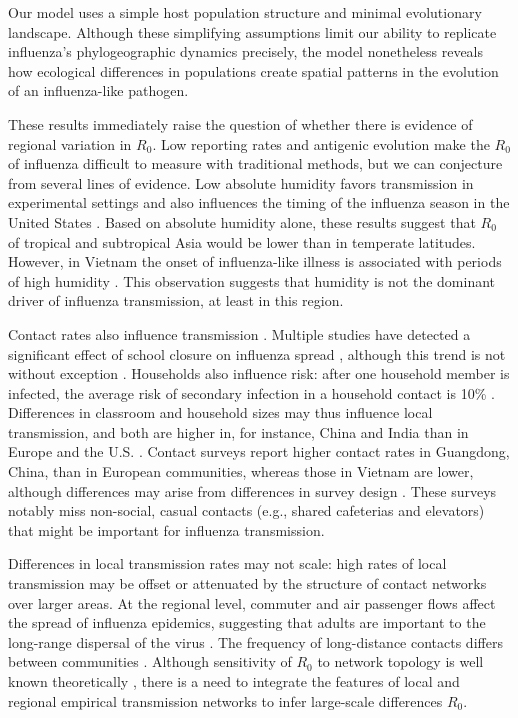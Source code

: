 \documentclass[10pt]{article}
\begin{document}
Our model uses a simple host population structure and minimal evolutionary landscape. 
Although these simplifying assumptions limit our ability to replicate influenza's phylogeographic dynamics precisely, the model nonetheless reveals how ecological differences in populations create spatial patterns in the evolution of an influenza-like pathogen.

These results immediately raise the question of whether there is evidence of regional variation in $R_0$.
Low reporting rates and antigenic evolution make the $R_0$ of influenza difficult to measure with traditional methods, but we can conjecture from several lines of evidence.
Low absolute humidity favors transmission in experimental settings \cite{Shaman:2009gp} and also influences the timing of the influenza season in the United States \cite{Shaman:2010aa}. 
Based on absolute humidity alone, these results suggest that $R_0$ of tropical and subtropical Asia would be lower than in temperate latitudes. 
However, in Vietnam the onset of influenza-like illness is associated with periods of high humidity \cite{Thai:2015fp}. 
This observation suggests that humidity is not the dominant driver of influenza transmission, at least in this region.

Contact rates also influence transmission \cite{Wallinga:2006ct}.
Multiple studies have detected a significant effect of school closure on influenza spread \cite{Cauchemez:2008cq, Heymann:2004wy, Chao:2010fo}, although this trend is not without exception \cite{Cowling:2008bn}.
Households also influence risk: after one household member is infected, the average risk of secondary infection in a household contact is 10\% \cite{Tsang:2015kb}. 
Differences in classroom and household sizes may thus influence local transmission, and both are higher in, for instance, China and India than in Europe and the U.S. \cite{UNSD:2011, OECD:2015}.
Contact surveys report higher contact rates in Guangdong, China, than in European communities, whereas those in Vietnam are lower, although differences may arise from differences in survey design \cite{Read:2014kk, Mossong:2008kk, Horby:2011eh}. 
These surveys notably miss non-social, casual contacts (e.g., shared cafeterias and elevators) that might be important for influenza transmission.

Differences in local transmission rates may not scale: high rates of local transmission may be offset or attenuated by the structure of contact networks over larger areas. 
At the regional level, commuter and air passenger flows affect the spread of influenza epidemics, suggesting that adults are important to the long-range dispersal of the virus \cite{Viboud:2006ge, Lemey:2014ez}. 
The frequency of long-distance contacts differs between communities \cite{Read:2014kk}. 
Although sensitivity of $R_0$ to network topology is well known theoretically \cite{Miller:2009kq, Adler:1992wu}, there is a need to integrate the features of local and regional empirical transmission networks to infer large-scale differences $R_0$.  
\end{document}

